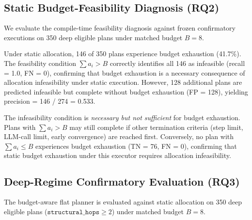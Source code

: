 \subsection{Static Budget-Feasibility Diagnosis (RQ2)}\label{sec:results:c2}

We evaluate the compile-time feasibility diagnosis against frozen confirmatory executions on 350 deep eligible plans under matched budget $B = 8$.

\begin{table}[t]
\centering
{}%
\caption{Feasibility confusion matrix on 350 frozen deep plans. Prediction is $\sum a_i > B$ (infeasible); outcome is budget exhaustion (BE). Positive = infeasible, positive outcome = BE.}
\label{tab:confusion}
\end{table}

\noindent Under static allocation, 146 of 350 plans experience budget exhaustion (41.7\%). The feasibility condition $\sum a_i > B$ correctly identifies all 146 as infeasible (recall = 1.0, FN = 0), confirming that budget exhaustion is a necessary consequence of allocation infeasibility under static execution. However, 128 additional plans are predicted infeasible but complete without budget exhaustion (FP = 128), yielding precision = 146 / 274 = 0.533.

The infeasibility condition is \emph{necessary but not sufficient} for budget exhaustion. Plans with $\sum a_i > B$ may still complete if other termination criteria (step limit, LLM-call limit, early convergence) are reached first. Conversely, no plan with $\sum a_i \leq B$ experiences budget exhaustion (TN = 76, FN = 0), confirming that static budget exhaustion under this executor requires allocation infeasibility.

\subsection{Deep-Regime Confirmatory Evaluation (RQ3)}\label{sec:results:deep}

The budget-aware flat planner is evaluated against static allocation on 350 deep eligible plans ($\texttt{structural\_hops} \geq 2$) under matched budget $B = 8$.

